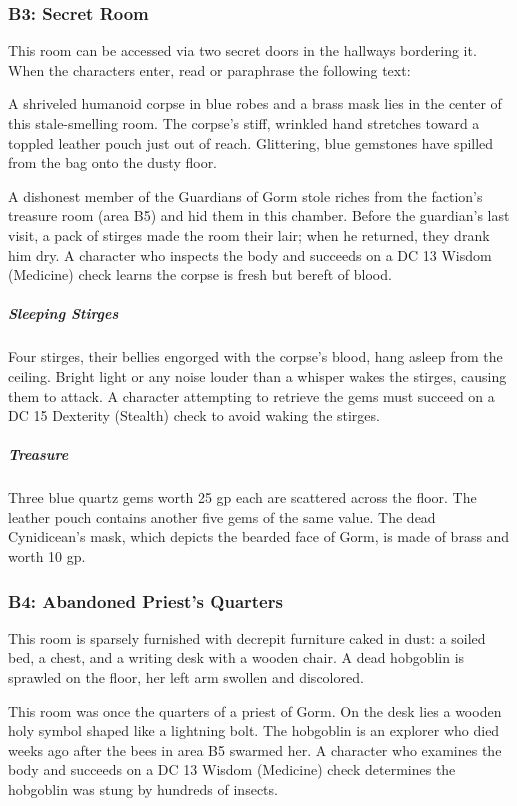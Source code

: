 \documentclass[10pt,a4paper,twoside,bg=print,twocolumn,openany,nodeprecatedcode]{dndbook}
\begin{document}
\subsubsection{B3: Secret Room}
This room can be accessed via two secret doors in the hallways bordering it. When the characters enter, read or paraphrase the following text:

\begin{DndReadAloud}{}
A shriveled humanoid corpse in blue robes and a brass mask lies in the center of this stale-smelling room. The corpse's stiff, wrinkled hand stretches toward a toppled leather pouch just out of reach. Glittering, blue gemstones have spilled from the bag onto the dusty floor.

\end{DndReadAloud}

A dishonest member of the Guardians of Gorm stole riches from the faction's treasure room (area B5) and hid them in this chamber. Before the guardian's last visit, a pack of stirges made the room their lair; when he returned, they drank him dry. A character who inspects the body and succeeds on a DC 13 Wisdom (Medicine) check learns the corpse is fresh but bereft of blood.

\subparagraph{Sleeping Stirges}
Four stirges, their bellies engorged with the corpse's blood, hang asleep from the ceiling. Bright light or any noise louder than a whisper wakes the stirges, causing them to attack. A character attempting to retrieve the gems must succeed on a DC 15 Dexterity (Stealth) check to avoid waking the stirges.

\subparagraph{Treasure}
Three blue quartz gems worth 25 gp each are scattered across the floor. The leather pouch contains another five gems of the same value. The dead Cynidicean's mask, which depicts the bearded face of Gorm, is made of brass and worth 10 gp.

\subsubsection{B4: Abandoned Priest's Quarters}
\begin{DndReadAloud}{}
This room is sparsely furnished with decrepit furniture caked in dust: a soiled bed, a chest, and a writing desk with a wooden chair. A dead hobgoblin is sprawled on the floor, her left arm swollen and discolored.

\end{DndReadAloud}

This room was once the quarters of a priest of Gorm. On the desk lies a wooden holy symbol shaped like a lightning bolt. The hobgoblin is an explorer who died weeks ago after the bees in area B5 swarmed her. A character who examines the body and succeeds on a DC 13 Wisdom (Medicine) check determines the hobgoblin was stung by hundreds of insects.
\end{document}
